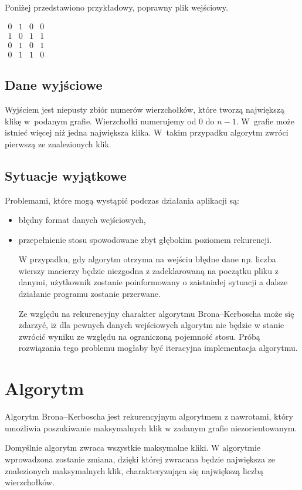 \documentclass[12pt, a4paper]{article}
\begin{document}
Poniżej przedstawiono przykładowy, poprawny plik wejściowy.

\bigskip

$ 
\begin{array}{cccc}
0 & 1 & 0 & 0 \\
1 & 0 & 1 & 1 \\
0 & 1 & 0 & 1 \\
0 & 1 & 1 & 0
\end{array}
$
\bigskip

\subsection{Dane wyjściowe}
Wyjściem jest niepusty zbiór numerów wierzchołków, które tworzą największą klikę w~podanym grafie. 
Wierzchołki numerujemy od 0 do $n-1$. W~grafie może istnieć więcej niż jedna największa klika.
W~takim przypadku algorytm zwróci pierwszą ze znalezionych klik.
\subsection{Sytuacje wyjątkowe}
Problemami, które mogą wystąpić podczas działania aplikacji są:
\begin{itemize}
	\item błędny format danych wejściowych,
	\item przepełnienie stosu spowodowane zbyt głębokim poziomem rekurencji.

\bigskip
W przypadku, gdy algorytm otrzyma na wejściu błędne dane np. liczba wierszy macierzy będzie niezgodna z zadeklarowaną na początku pliku z danymi, użytkownik zostanie poinformowany o zaistniałej sytuacji a dalsze działanie programu zostanie przerwane.

\bigskip
Ze względu na rekurencyjny charakter algorytmu Brona--Kerboscha może się zdarzyć, iż dla pewnych danych wejściowych algorytm nie będzie w stanie zwrócić wyniku ze względu na ograniczoną pojemność stosu.
Próbą rozwiązania tego problemu mogłaby być iteracyjna implementacja algorytmu.

\end{itemize}
\section{Algorytm}
\label{bron_kerbosch}
Algorytm Brona--Kerboscha jest rekurencyjnym algorytmem z nawrotami, który umożliwia poszukiwanie maksymalnych klik w zadanym grafie niezorientowanym.

Domyślnie algorytm zwraca wszystkie maksymalne kliki. W algorytmie wprowadzona zostanie zmiana, dzięki której zwracana będzie największa ze znalezionych maksymalnych klik, charakteryzująca się największą liczbą wierzchołków.
\end{document}
